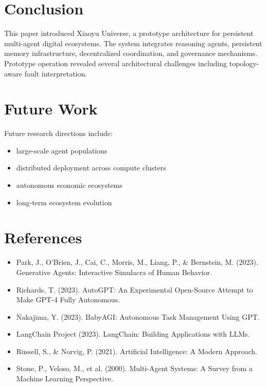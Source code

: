 \documentclass[11pt]{article}
\begin{document}
\section{Conclusion}
This paper introduced Xiaoyu Universe, a prototype architecture for persistent multi-agent digital ecosystems. The system integrates reasoning agents, persistent memory infrastructure, decentralized coordination, and governance mechanisms. Prototype operation revealed several architectural challenges including topology-aware fault interpretation.

\section{Future Work}
Future research directions include:
\begin{itemize}[leftmargin=1.5em]
\item large-scale agent populations
\item distributed deployment across compute clusters
\item autonomous economic ecosystems
\item long-term ecosystem evolution
\end{itemize}

\section*{References}
\begin{itemize}[leftmargin=1.5em]
\item Park, J., O'Brien, J., Cai, C., Morris, M., Liang, P., \& Bernstein, M. (2023). Generative Agents: Interactive Simulacra of Human Behavior.
\item Richards, T. (2023). AutoGPT: An Experimental Open-Source Attempt to Make GPT-4 Fully Autonomous.
\item Nakajima, Y. (2023). BabyAGI: Autonomous Task Management Using GPT.
\item LangChain Project (2023). LangChain: Building Applications with LLMs.
\item Russell, S., \& Norvig, P. (2021). Artificial Intelligence: A Modern Approach.
\item Stone, P., Veloso, M., et al. (2000). Multi-Agent Systems: A Survey from a Machine Learning Perspective.
\end{itemize}
\end{document}
